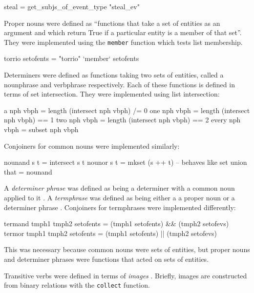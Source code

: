 \documentclass[../main.tex]{subfiles}
\begin{document}
\begin{code}
	steal = get_subjs_of_event_type "steal_ev"
\end{code}

Proper nouns were defined as ``functions that take a set of entities as an
argument and which return True if a particular entity is a member of that
set''\cite{frost2014denotational}.  They were implemented using the
\texttt{member} function which tests list membership.

\begin{code}
	torrio setofents  = "torrio" `member` setofents
\end{code}

Determiners were defined as functions taking two sets of entities, called
a nounphrase and verbphrase respectively.  Each of these functions
is defined in terms of set intersection.  They were implemented using
list intersection:

\begin{code}
  a     nph vbph     = length (intersect nph vbph) /= 0
  one   nph vbph     = length (intersect nph vbph)  == 1
  two   nph vbph     = length (intersect nph vbph)  == 2
  every nph vbph     = subset  nph vbph
\end{code}

Conjoiners for common nouns were implemented similarly:

\begin{code}
  nounand s t  = intersect s t
  nounor  s t  = mkset (s ++ t) -- behaves like set union
  that         = nounand
\end{code}


A {\em determiner phrase} was defined as being a determiner with a common noun applied to it \cite{frost2014denotational}.
A {\em termphrase} was defined as being either a a proper noun or a determiner phrase \cite{frost2014denotational}.
Conjoiners for termphrases were implemented differently:
\vspace{1em}
\begin{code}
 termand tmph1 tmph2 setofents = (tmph1 setofents) && (tmph2 setofevs)
 termor  tmph1 tmph2 setofents = (tmph1 setofents) || (tmph2 setofevs)
\end{code}
\vspace{1em}
This was necessary because common nouns were sets of entities, but
proper nouns and determiner phrases were functions that acted on sets
of entities.

Transitive verbs were defined in terms of {\em images} \cite{frost2014denotational}.  Briefly, images
are constructed from binary relations with the \texttt{collect} function.
\end{document}
